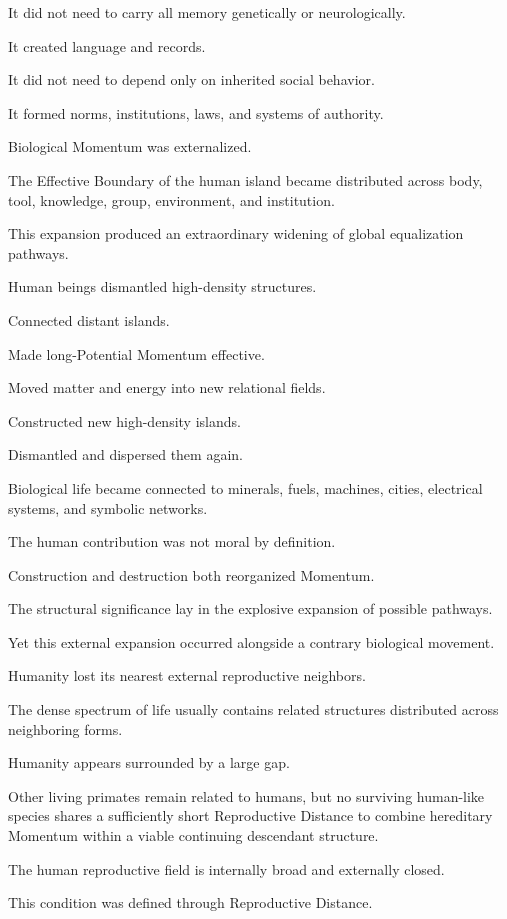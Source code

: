It did not need to carry all memory genetically or neurologically.

It created language and records.

It did not need to depend only on inherited social behavior.

It formed norms, institutions, laws, and systems of authority.

Biological Momentum was externalized.

The Effective Boundary of the human island became distributed across body, tool, knowledge, group, environment, and institution.

This expansion produced an extraordinary widening of global equalization pathways.

Human beings dismantled high-density structures.

Connected distant islands.

Made long-Potential Momentum effective.

Moved matter and energy into new relational fields.

Constructed new high-density islands.

Dismantled and dispersed them again.

Biological life became connected to minerals, fuels, machines, cities, electrical systems, and symbolic networks.

The human contribution was not moral by definition.

Construction and destruction both reorganized Momentum.

The structural significance lay in the explosive expansion of possible pathways.

Yet this external expansion occurred alongside a contrary biological movement.

Humanity lost its nearest external reproductive neighbors.

The dense spectrum of life usually contains related structures distributed across neighboring forms.

Humanity appears surrounded by a large gap.

Other living primates remain related to humans, but no surviving human-like species shares a sufficiently short Reproductive Distance to combine hereditary Momentum within a viable continuing descendant structure.

The human reproductive field is internally broad and externally closed.

This condition was defined through Reproductive Distance.

